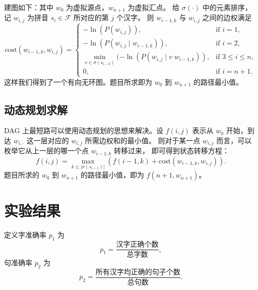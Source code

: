 \documentclass[UTF8]{ctexart}
\begin{document}
建图如下：其中 $w_0$ 为虚拟源点，$w_{n+1}$ 为虚拟汇点。
给 $\sigma(\cdot)$ 中的元素排序，
记 $w_{i, j}$ 为拼音 $s_i \in \mathcal{F}$ 所对应的第 $j$ 个汉字。
则 $w_{i-1, k}$ 与 $w_{i, j}$ 之间的边权满足
\begin{equation*}
\text{cost}(w_{i-1, k}, w_{i, j}) =
    \begin{cases}
        -\ln(P(w_{i, j})), & \text{if } i = 1, \\
        -\ln(P(w_{i, j}\mid w_{i-1, k})), & \text{if } i = 2, \\
        \min\limits_{v \in \sigma(s_{i-2})}(-\ln(P(w_{i, j}\mid v \; w_{i-1, k})), & \text{if } 3 \le i \le n, \\
        0, & \text{if } i=n+1.
    \end{cases}
\end{equation*}
这样我们得到了一个有向无环图。题目所求即为 $w_0$ 到 $w_{n+1}$ 的路径最小值。

\subsection{动态规划求解}

DAG 上最短路可以使用动态规划的思想来解决。设 $f(i, j)$ 表示从 $w_0$ 开始，到达 $w_{i, \cdot}$ 这一层对应的 $w_{i, j}$ 所需边权和的最小值。
则对于某一点 $w_{i, j}$ 而言，可以枚举它从上一层的哪一个点 $w_{i-1, k}$ 转移过来，
即可得到状态转移方程：
\begin{equation*}
f(i, j) = \max_{k \le \left|\sigma(s_{i - 1})\right|}(f(i - 1, k) + \text{cost}(w_{i-1, k}, w_{i, j})).
\end{equation*}
题目所求的 $w_0$ 到 $w_{n+1}$ 的路径最小值，即为 $f(n+1, w_{n+1})$。

\section{实验结果}

定义字准确率 $p_1$ 为
\begin{equation*}
    p_1 = \frac{\text{汉字正确个数}}{\text{总字数}},
\end{equation*}
句准确率 $p_2$ 为
\begin{equation*}
    p_2 = \frac{\text{所有汉字均正确的句子个数}}{\text{总句数}}.
\end{equation*}
\end{document}
